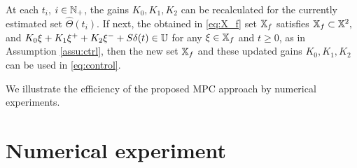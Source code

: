 \documentclass[letterpaper, 10 pt, conference]{ieeeconf}  %
\begin{document}
\begin{remark}
At each $t_{i}$, $i\in\mathbb{N}_{+}$, the gains $K_{0},K_{1},K_{2}$
can be recalculated for the currently estimated set $\hat{\Theta}(t_{i})$.
If next, the obtained in \eqref{eq:X_f} set $\mathbb{X}_{f}$ satisfies 
$
\mathbb{X}_{f}\subset\mathbb{X}^{2},
$
and
$
K_{0}\xi+K_{1}\xi^{+}+K_{2}\xi^{-}+S\delta(t)\in\mathbb{U}
$
for any $\xi\in\mathbb{X}_{f}$ and $t\geq0$, as in Assumption \ref{assu:ctrl},
then the new set $\mathbb{X}_{f}$ and these updated gains $K_{0},K_{1},K_{2}$
can be used in \eqref{eq:control}.
\end{remark}

We illustrate the efficiency of the proposed MPC approach by numerical
experiments.

\section{\label{sec:experiments} Numerical experiment}
\end{document}
